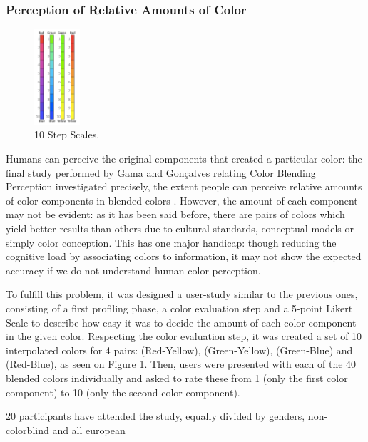\subsubsection{Perception of Relative Amounts of Color}
\label{subsubsec:perception_amounts}
%
\begin{figure}
	\centering
    \vspace{-15pt}
    \includegraphics[width=0.15\textwidth]{images/background/TotalAmount.png}
    \caption[Perception of Relative Amounts of Color - Rulers]{10 Step Scales.
    \protect\cite{Gama20142}}
    \label{fig:amount1}
\end{figure}
%
Humans can perceive the original
components that created a particular color: the final study performed by Gama and Gonçalves relating Color Blending
Perception investigated precisely, the extent people can perceive relative amounts of color components in
blended colors \cite{Gama20142}. However, the amount of each component may not be evident: as it has been said before,
there are pairs of colors which yield better results than others due to cultural standards, conceptual models
or simply color conception. This has one major handicap: though reducing the cognitive load by
associating colors to information, it may not show the expected accuracy if we do not understand
human color perception. \par
%
To fulfill this problem, it was designed a user-study similar to the previous ones, consisting of a first
profiling phase, a color evaluation step and a 5-point Likert Scale to describe how easy it was to decide
the amount of each color component in the given color. Respecting the color evaluation step, it was created
a set of 10 interpolated colors for 4 pairs: (Red-Yellow), (Green-Yellow), (Green-Blue) and (Red-Blue),
as seen on Figure \ref{fig:amount1}. Then, users were presented with each of the 40 blended colors individually and
asked to rate these from 1 (only the first color component) to 10 (only the second color component). \par
%
20 participants have attended the study, equally divided by genders, non-colorblind and all european

